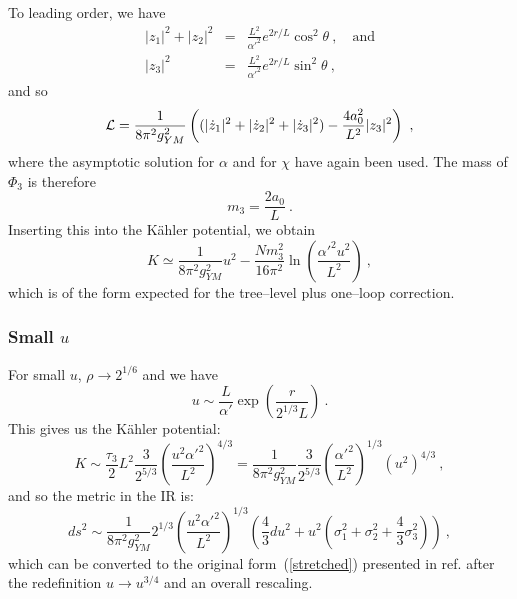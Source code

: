 \documentclass[a4paper,12pt]{article}
\newcommand{\reef}[1]{(\ref{#1})}
\begin{document}
To leading order, we have 
\begin{eqnarray}
  |z_1|^2 + |z_2|^2 & = & \frac{L^2}{{\alpha'}^2} e^{2r/L} \cos^2 \theta\ ,
\quad\mbox{and}\nonumber\\
  |z_3|^2 & = & \frac{L^2}{{\alpha'}^2} e^{2r/L} \sin^2 \theta\ ,
\end{eqnarray}
and so
\begin{equation}
  {\cal L} = \frac{1}{8\pi^2 g_{YM}^2} \left((|\dot{z}_1|^2 + |\dot{z}_2|^2 + |\dot{z}_3|^2) -  \frac{4 a_0^2}{L^2} |z_3|^2 \right)\ ,
\end{equation}
%
where the asymptotic solution for $\alpha$ and for $\chi$ have again been used.  The mass of $\Phi_3$  is therefore 
\begin{equation}
  m_3 = \frac{2 a_0}{L}\ .
\end{equation}
%
Inserting this into the K\"ahler potential, we obtain
\begin{equation}
  K \simeq \frac{1}{8 \pi^2 g_{YM}^2} u^2 
- \frac{N m_3^2}{16 \pi^2} \ln\left(\frac{{\alpha'}^2 u^2}{L^2}\right)\ ,
\end{equation}
which is of the form expected for the tree--level plus  one--loop  correction.

\subsubsection{Small $u$}
\label{infra}

For small $u$, $\rho \to 2^{1/6}$ and we have
\begin{equation}
  u \sim \frac{L}{\alpha'} \exp\left( \frac{r}{2^{1/3} L} \right)\ .
\end{equation}
This gives us the K\"ahler potential:
\begin{equation}
  K \sim \frac{\tau_3}{2} L^2 \frac{3}{2^{5/3}} \left(\frac{u^2 {\alpha'}^2}{L^2}\right)^{4/3} = \frac{1}{8 \pi^2 g_{YM}^2} \frac{3}{2^{5/3}} \left(\frac{{\alpha'}^2}{L^2}\right)^{1/3} (u^2)^{4/3} \ ,
\end{equation}
and so the metric in the IR is:
\begin{equation}
  ds^2 \sim \frac{1}{8 \pi^2 g_{YM}^2} 2^{1/3} \left(\frac{u^2 {\alpha'}^2}{L^2}\right)^{1/3} \left(\frac{4}{3} du^2 + u^2 \left(\sigma_1^2 + \sigma_2^2 + \frac{4}{3} \sigma_3^2 \right)\right) \ ,
\end{equation}
which can be converted to the original form~\reef{stretched} presented
in ref.\cite{jlp} after the redefinition $u\to u^{3/4}$ and an overall
rescaling.
\end{document}

